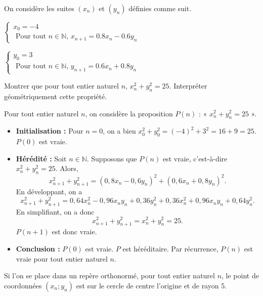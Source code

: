 \documentclass[11pt,fleqn]{book} %
\begin{document}
\begin{exercise}
On considère les suites $(x_n)$ et $(y_n)$ définies comme suit.

\begin{minipage}{0.45\linewidth}
$\left\{ \begin{array}{ll}
x_0 = -4 \\
\text{ Pour tout }n \in \mathbb{N}, \, x_{n+1}=0.8x_n-0.6y_n
\end{array}\right.$
\end{minipage}\hfill\begin{minipage}{0.45\linewidth}
$\left\{ \begin{array}{ll}
y_0 = 3 \\
\text{ Pour tout }n\in\mathbb{N}, \, y_{n+1}=0.6x_n+0.8y_n
\end{array}\right.$
\end{minipage}

Montrer que pour tout entier naturel $n$, $x_n^2 + y_n^2= 25$. Interpréter géométriquement cette propriété.\end{exercise}
\begin{solution}Pour tout entier naturel $n$, on considère la proposition $P(n)$ : « $x_n^2+y_n^2=25 $ ».
\begin{itemize}
\item \textbf{Initialisation :} Pour $n=0$, on a bien $x_0^2+y_0^2=(-4)^2+3^2=16+9=25$. $P(0)$ est vraie.
\item \textbf{Hérédité :} Soit $n\in\mathbb{N}$. Supposons que $P(n)$ est vraie, c'est-à-dire $x_n^2+y_n^2=25$. Alors,
\[x_{n+1}^2+y_{n+1}^2=(0,8x_n-0,6y_n)^2+(0,6x_n+0,8y_n)^2.\]
En développant, on a
\[x_{n+1}^2+y_{n+1}^2=0,64x_n^2-0,96x_ny_n+0,36y_n^2+0,36x_n^2+0,96x_ny_n+0,64y_n^2.\]
En simplifiant, on a donc
\[x_{n+1}^2+y_{n+1}^2=x_n^2+y_n^2=25.\]
 $P(n+1)$ est donc vraie.
\item \textbf{Conclusion :} $P(0)$ est vraie. $P$ est héréditaire. Par récurrence, $P(n)$ est vraie pour tout entier naturel $n$.
\end{itemize}
Si l'on se place dans un repère orthonormé, pour tout entier naturel \(n\), le point de coordonnées $(x_n;y_n)$ est sur le cercle de centre l'origine et de rayon 5. \end{solution}
\end{document}
